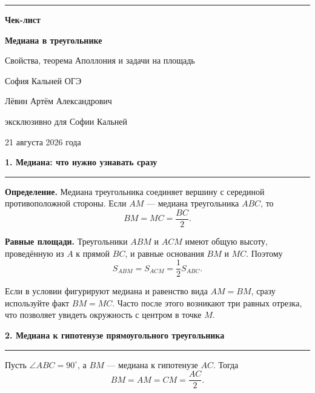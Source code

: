 \documentclass[a4paper,12pt]{article}
\newcommand{\topic}[1]{%
  \vspace{0.35em}%
  {\large\bfseries\color{darkaccent}#1\par}%
  \vspace{0.15em}%
  {\color{accent!70}\rule{\linewidth}{0.45pt}}%
  \vspace{0.35em}%
}
\newcommand{\subtopic}[1]{\vspace{0.2em}{\bfseries\color{darkaccent}#1}\par}
\newcommand{\key}[1]{\textbf{\color{darkaccent}#1}}
\newcommand{\formula}[1]{\[\boxed{\displaystyle #1}\]}
\begin{document}
\begin{titlepage}
\thispagestyle{empty}
\centering
\vspace*{2.2cm}
{\color{darkaccent}\rule{0.22\linewidth}{1.1pt}}\par
\vspace{0.8cm}
{\Huge\bfseries Чек-лист\par}
\vspace{0.55cm}
{\LARGE\bfseries\color{darkaccent}Медиана в треугольнике\par}
\vspace{0.2cm}
{\Large Свойства, теорема Аполлония и задачи на площадь\par}
\vspace{1.4cm}
{\large София Кальней \textbullet{} ОГЭ\par}
\vfill
{\large Лёвин Артём Александрович\par}
\vspace{0.15cm}
{\normalsize эксклюзивно для Софии Кальней\par}
\vspace{0.55cm}
{\normalsize 21 августа 2026 года\par}
\vfill
{}
\end{titlepage}

\topic{1. Медиана: что нужно узнавать сразу}

\key{Определение.}
Медиана треугольника соединяет вершину с серединой противоположной стороны.
Если $AM$ --- медиана треугольника $ABC$, то
\[
BM=MC=\frac{BC}{2}.
\]

\key{Равные площади.}
Треугольники $ABM$ и $ACM$ имеют общую высоту, проведённую из $A$ к прямой $BC$, и равные основания $BM$ и $MC$. Поэтому
\formula{S_{ABM}=S_{ACM}=\frac12 S_{ABC}.}

\subtopic{Быстрая проверка условия}
Если в условии фигурируют медиана и равенство вида $AM=BM$, сразу используйте факт $BM=MC$.
Часто после этого возникают три равных отрезка, что позволяет увидеть окружность с центром в точке $M$.

\topic{2. Медиана к гипотенузе прямоугольного треугольника}

Пусть $\angle ABC=90^\circ$, а $BM$ --- медиана к гипотенузе $AC$. Тогда
\formula{BM=AM=CM=\frac{AC}{2}.}
\end{document}
